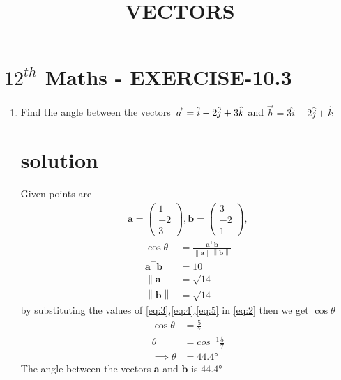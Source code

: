 \documentclass[journal,12pt]{article}
\newcommand{\myvec}[1]{\ensuremath{\begin{pmatrix}#1\end{pmatrix}}}
\providecommand{\norm}[1]{\left\lVert#1\right\rVert}
\let\vec\mathbf
\begin{document}
\begin{center}
\title{\textbf{VECTORS}}
\date{\vspace{-5ex}} %
\maketitle
\end{center}

\section*{$12^{th}$ Maths - EXERCISE-10.3}

\begin{enumerate}
\item Find the angle between the vectors $\\ \overrightarrow{a}=\hat{i}-2\hat{j}+3\hat{k}$ and $\overrightarrow{b}=3\hat{i}-2\hat{j}+\hat{k}$  
\section*{solution}
Given points are
\begin{align}
\vec{a} = \myvec{1\\-2\\3} , \vec{b} = \myvec{3\\ -2 \\ 1},
\end{align}
\begin{align}
\cos\theta&=\frac{\vec{a}^{\top}\vec{b}}{\norm{\vec{a}}\norm{\vec{b}}}\label{eq:2}\\
\vec{a}^{\top}\vec{b}&=10 \label{eq:3} \\
\norm{\vec{a}}&=\sqrt{14} \label{eq:4}\\
\norm{\vec{b}}&=\sqrt{14}
\label{eq:5}
\end{align}
		by substituting the values of \eqref{eq:3},\eqref{eq:4},\eqref{eq:5} in \eqref{eq:2} then  we get $\cos\theta$
\begin{align}
	\cos\theta &= \frac{5}{7}\\
	\theta&= cos^{-1}\frac{5}{7}\\
	\implies \theta&=\ang{44.4}
\end{align}
 The angle between the vectors $\vec{a}$ and $\vec{b}$ is $\ang{44.4}$
\end{enumerate}
\end{document}
